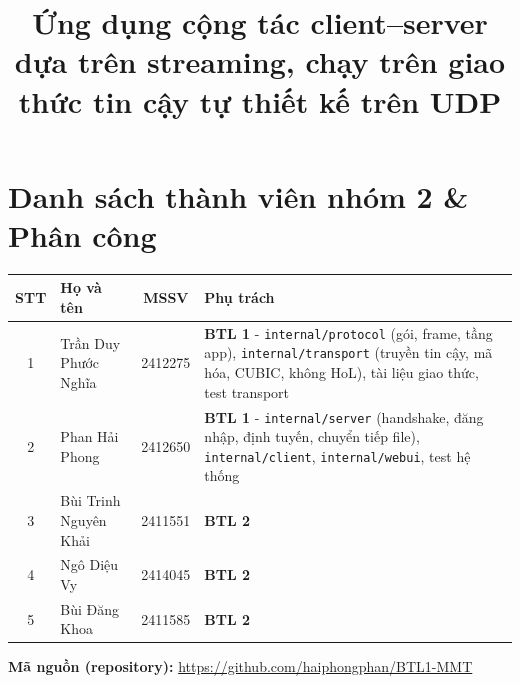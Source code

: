 \documentclass[final]{hcmut-report}
\title{Ứng dụng cộng tác client--server dựa trên streaming, chạy trên giao thức tin cậy tự thiết kế trên UDP}
\newcommand{\fname}[1]{\texttt{#1}}
\begin{document}
\coverpage%

\section*{Danh sách thành viên nhóm 2 \& Phân công}
\begin{center}
  \begin{tabularx}{\linewidth}{clcY}
    \toprule
    \textbf{STT} & \textbf{Họ và tên} & \textbf{MSSV} & \textbf{Phụ trách} \\
     & Trần Duy Phước Nghĩa & 2412275 & \textbf{BTL 1} - \fname{internal/protocol} (gói, frame, tầng app), \fname{internal/transport} (truyền tin cậy, mã hóa, CUBIC, không HoL), tài liệu giao thức, test transport \\
    2 & Phan Hải Phong & 2412650 & \textbf{BTL 1} - \fname{internal/server} (handshake, đăng nhập, định tuyến, chuyển tiếp file), \fname{internal/client}, \fname{internal/webui}, test hệ thống \\
    3 & Bùi Trinh Nguyên Khải & 2411551 &  \textbf{BTL 2} \\
    4 & Ngô Diệu Vy & 2414045  &  \textbf{BTL 2} \\
    5 & Bùi Đăng Khoa & 2411585  &  \textbf{BTL 2} \\
    \bottomrule
  \end{tabularx}
\end{center}

\vspace{1em}
\noindent\textbf{Mã nguồn (repository):} \url{https://github.com/haiphongphan/BTL1-MMT}
\clearpage

\tableofcontents
\listoffigures

\clearpage













\end{document}
